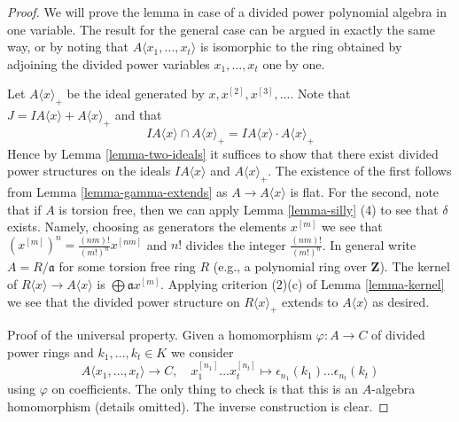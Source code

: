 \documentclass{stacks-project}
\theoremstyle{plain}
\theoremstyle{definition}
\theoremstyle{remark}
\numberwithin{equation}{subsection}
\begin{document}
\begin{proof}
We will prove the lemma in case of a divided power polynomial algebra
in one variable. The result for the general case can be argued in exactly
the same way, or by noting that $A\langle x_1, \ldots, x_t\rangle$ is
isomorphic to the ring obtained by adjoining the divided power variables
$x_1, \ldots, x_t$ one by one.

\medskip\noindent
Let $A\langle x \rangle_{+}$ be the ideal generated by
$x, x^{[2]}, x^{[3]}, \ldots$.
Note that $J = IA\langle x \rangle + A\langle x \rangle_{+}$
and that
$$
IA\langle x \rangle \cap A\langle x \rangle_{+} =
IA\langle x \rangle \cdot A\langle x \rangle_{+}
$$
Hence by Lemma \ref{lemma-two-ideals} it suffices to show that there
exist divided power structures on the ideals $IA\langle x \rangle$ and
$A\langle x \rangle_{+}$. The existence of the first follows from
Lemma \ref{lemma-gamma-extends} as $A \to A\langle x \rangle$ is flat.
For the second, note that if $A$ is torsion free, then we can apply
Lemma \ref{lemma-silly} (4) to see that $\delta$ exists. Namely, choosing
as generators the elements $x^{[m]}$ we see that
$(x^{[m]})^n = \frac{(nm)!}{(m!)^n} x^{[nm]}$
and $n!$ divides the integer $\frac{(nm)!}{(m!)^n}$.
In general write $A = R/\mathfrak a$ for some torsion free ring $R$
(e.g., a polynomial ring over $\mathbf{Z}$). The kernel of
$R\langle x \rangle \to A\langle x \rangle$ is
$\bigoplus \mathfrak a x^{[m]}$. Applying criterion (2)(c) of
Lemma \ref{lemma-kernel} we see that the divided power structure
on $R\langle x \rangle_{+}$ extends to $A\langle x \rangle$ as
desired.

\medskip\noindent
Proof of the universal property. Given a homomorphism $\varphi : A \to C$
of divided power rings and $k_1, \ldots, k_t \in K$ we consider
$$
A\langle x_1, \ldots, x_t \rangle \to C,\quad
x_1^{[n_1]} \ldots x_t^{[n_t]} \longmapsto
\epsilon_{n_1}(k_1) \ldots \epsilon_{n_t}(k_t)
$$
using $\varphi$ on coefficients. The only thing to check is that
this is an $A$-algebra homomorphism (details omitted). The inverse
construction is clear.
\end{proof}
\end{document}
